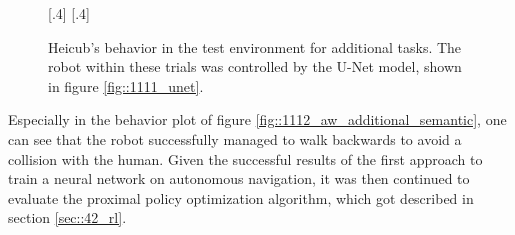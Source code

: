 \begin{figure}[h!]
	\centering
	[.4\linewidth]{}
	[.4\linewidth]{}
	\caption{Heicub's behavior in the test environment for additional tasks. The robot within these trials was controlled by the U-Net model, shown in figure \ref{fig::1111_unet}.}
\label{fig::1112_aw_gif_additional}
\end{figure} 
Especially in the behavior plot of figure \ref{fig::1112_aw_additional_semantic}, one can see that the robot successfully managed to walk backwards to avoid a collision with the human. Given the successful results of the first approach to train a neural network on autonomous navigation, it was then continued to evaluate the proximal policy optimization algorithm, which got described in section \ref{sec::42_rl}.
